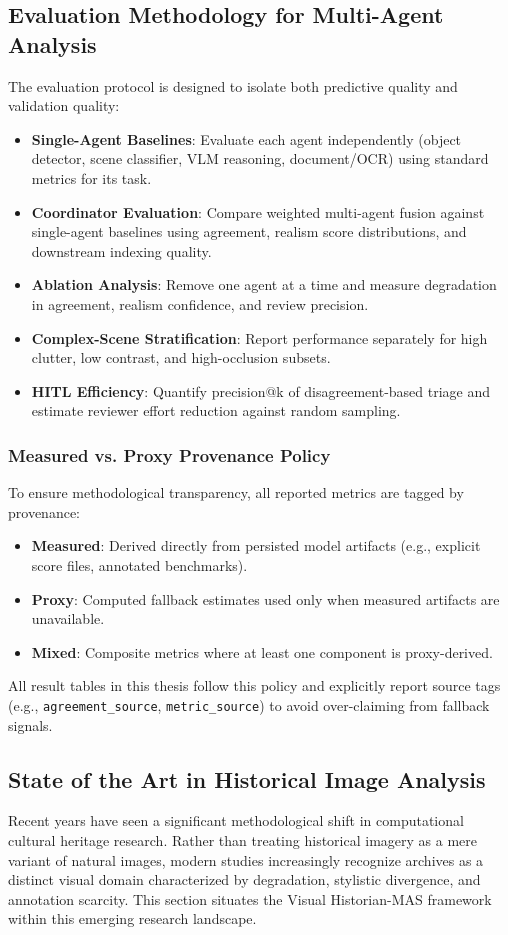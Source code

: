 \documentclass[12pt,onecolumn,a4paper]{IEEEtran}
\begin{document}
\subsection{Evaluation Methodology for Multi-Agent Analysis}
The evaluation protocol is designed to isolate both predictive quality and validation quality:
\begin{itemize}
    \item \textbf{Single-Agent Baselines}: Evaluate each agent independently (object detector, scene classifier, VLM reasoning, document/OCR) using standard metrics for its task.
    \item \textbf{Coordinator Evaluation}: Compare weighted multi-agent fusion against single-agent baselines using agreement, realism score distributions, and downstream indexing quality.
    \item \textbf{Ablation Analysis}: Remove one agent at a time and measure degradation in agreement, realism confidence, and review precision.
    \item \textbf{Complex-Scene Stratification}: Report performance separately for high clutter, low contrast, and high-occlusion subsets.
    \item \textbf{HITL Efficiency}: Quantify precision@k of disagreement-based triage and estimate reviewer effort reduction against random sampling.
\end{itemize}

\subsubsection{Measured vs. Proxy Provenance Policy}
To ensure methodological transparency, all reported metrics are tagged by provenance:
\begin{itemize}
    \item \textbf{Measured}: Derived directly from persisted model artifacts (e.g., explicit score files, annotated benchmarks).
    \item \textbf{Proxy}: Computed fallback estimates used only when measured artifacts are unavailable.
    \item \textbf{Mixed}: Composite metrics where at least one component is proxy-derived.
\end{itemize}
All result tables in this thesis follow this policy and explicitly report source tags (e.g., \texttt{agreement\_source}, \texttt{metric\_source}) to avoid over-claiming from fallback signals.

\subsection{State of the Art in Historical Image Analysis}
Recent years have seen a significant methodological shift in computational cultural heritage research. Rather than treating historical imagery as a mere variant of natural images, modern studies increasingly recognize archives as a distinct visual domain characterized by degradation, stylistic divergence, and annotation scarcity. This section situates the Visual Historian-MAS framework within this emerging research landscape.
\end{document}
